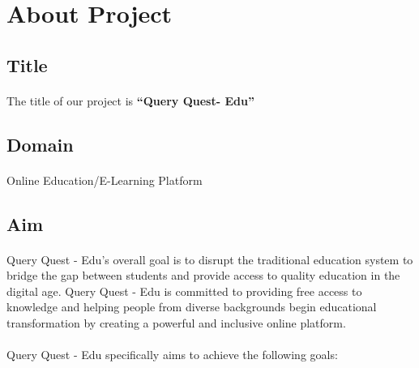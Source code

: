 \section{About Project }
\subsection{Title}
\paragraph{}The title of our project is \textbf{ “Query Quest-  Edu”}
\subsection{Domain}
\paragraph{}Online Education/E-Learning Platform
\subsection{Aim }
\paragraph{}Query Quest - Edu's overall goal is to disrupt the traditional education system to bridge the gap between students and provide access to quality education in the digital age. Query Quest - Edu is committed to providing free access to knowledge and helping people from diverse backgrounds begin educational transformation by creating a powerful and inclusive online platform.

\paragraph{}Query Quest - Edu specifically aims to achieve the following goals:

